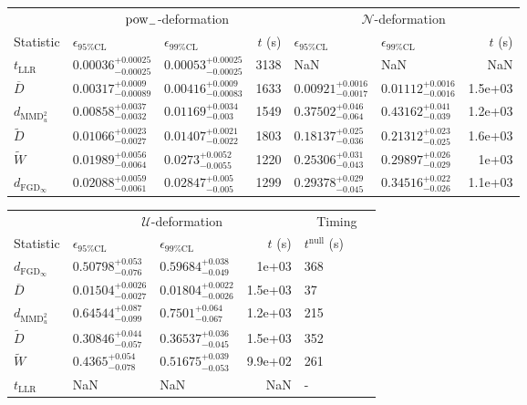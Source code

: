 \begin{landscape}
    \begin{tabular}{l|llr|llr}
\toprule
\multicolumn{1}{c}{} & \multicolumn{3}{c}{$\rm{pow}_{-}$-deformation} & \multicolumn{3}{c}{$\mathcal{N}$-deformation} \\
Statistic & $\epsilon_{95\%\mathrm{CL}}$ & $\epsilon_{99\%\mathrm{CL}}$ & $t$ (s) & $\epsilon_{95\%\mathrm{CL}}$ & $\epsilon_{99\%\mathrm{CL}}$ & $t$ (s) \\
\midrule
$t_{\mathrm{LLR}}$ & $0.00036_{-0.00025}^{+0.00025}$ & $0.00053_{-0.00025}^{+0.00025}$ & 3138 & NaN & NaN & NaN \\
$\overline{D}$ & $0.00317_{-0.00089}^{+0.0009}$ & $0.00416_{-0.00083}^{+0.0009}$ & 1633 & $0.00921_{-0.0017}^{+0.0016}$ & $0.01112_{-0.0016}^{+0.0016}$ & 1.5e+03 \\
$d_{\mathrm{MMD}^{2}_{u}}$ & $0.00858_{-0.0032}^{+0.0037}$ & $0.01169_{-0.003}^{+0.0034}$ & 1549 & $0.37502_{-0.064}^{+0.046}$ & $0.43162_{-0.039}^{+0.041}$ & 1.2e+03 \\
$\widetilde{D}$ & $0.01066_{-0.0027}^{+0.0023}$ & $0.01407_{-0.0022}^{+0.0021}$ & 1803 & $0.18137_{-0.036}^{+0.025}$ & $0.21312_{-0.025}^{+0.023}$ & 1.6e+03 \\
$\widetilde{W}$ & $0.01989_{-0.0064}^{+0.0056}$ & $0.0273_{-0.0055}^{+0.0052}$ & 1220 & $0.25306_{-0.043}^{+0.031}$ & $0.29897_{-0.029}^{+0.026}$ & 1e+03 \\
$d_{\mathrm{FGD}_{\infty}}$ & $0.02088_{-0.0061}^{+0.0059}$ & $0.02847_{-0.005}^{+0.005}$ & 1299 & $0.29378_{-0.045}^{+0.029}$ & $0.34516_{-0.026}^{+0.022}$ & 1.1e+03 \\
\bottomrule
\end{tabular}

    \begin{tabular}{l|llr|llr}
\toprule
\multicolumn{1}{c}{} & \multicolumn{3}{c}{$\mathcal{U}$-deformation} & \multicolumn{3}{c}{Timing} \\
Statistic & $\epsilon_{95\%\mathrm{CL}}$ & $\epsilon_{99\%\mathrm{CL}}$ & $t$ (s) & $t^{\mathrm{null}}$ (s) \\
\midrule
$d_{\mathrm{FGD}_{\infty}}$ & $0.50798_{-0.076}^{+0.053}$ & $0.59684_{-0.049}^{+0.038}$ & 1e+03 & 368 \\
$\overline{D}$ & $0.01504_{-0.0027}^{+0.0026}$ & $0.01804_{-0.0026}^{+0.0022}$ & 1.5e+03 & 37 \\
$d_{\mathrm{MMD}^{2}_{u}}$ & $0.64544_{-0.099}^{+0.087}$ & $0.7501_{-0.067}^{+0.064}$ & 1.2e+03 & 215 \\
$\widetilde{D}$ & $0.30846_{-0.057}^{+0.044}$ & $0.36537_{-0.045}^{+0.036}$ & 1.5e+03 & 352 \\
$\widetilde{W}$ & $0.4365_{-0.078}^{+0.054}$ & $0.51675_{-0.053}^{+0.039}$ & 9.9e+02 & 261 \\
$t_{\mathrm{LLR}}$ & NaN & NaN & NaN & - \\
\bottomrule
\end{tabular}

\end{landscape}
